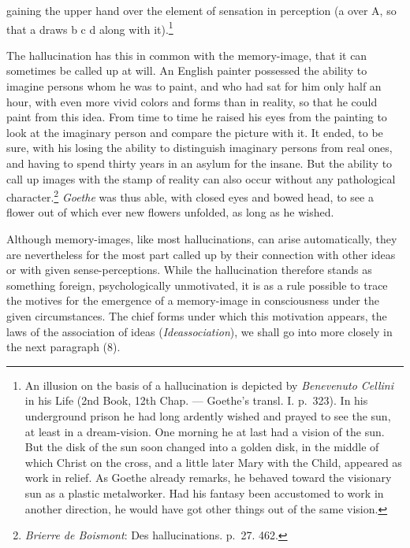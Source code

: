 \documentclass[12pt,a4paper]{book}
\newcommand{\opage}[1]{\marginnote{\footnotesize\textit{[#1]}}}
\begin{document}
gaining the upper hand over the element of sensation in perception (a
over A, so that a draws b c d along with it).\footnote{An illusion on the
basis of a hallucination is depicted by \emph{Benevenuto Cellini} in his
Life (2nd Book, 12th Chap. --- Goethe's transl. I. p.~323). In his
underground prison he had long ardently wished and prayed to see the sun,
at least in a dream-vision. One morning he at last had a vision of the
sun. But the disk of the sun soon changed into a golden disk, in the
middle of which Christ on the cross, and a little later Mary with the
Child, appeared as work in relief. As Goethe already remarks, he behaved
toward the visionary sun as a plastic metalworker. Had his fantasy been
accustomed to work in another direction, he would have got other things
out of the same vision.}

The hallucination has this in common with the memory-image, that it can
sometimes be called up at will. An English painter possessed the ability to
imagine persons whom he was to paint, and who had sat for him only half an
hour, with even more vivid colors and forms than in reality, so that he
could paint from this idea. From time to time he raised his eyes from the
painting to look at the imaginary person and compare the picture with it.
It ended, to be sure, with his losing the ability to distinguish imaginary
persons from real ones, and having to spend thirty years in an asylum for
the insane. But the ability to call up images with the stamp of reality
can also occur without any pathological
character.\footnote{\emph{Brierre de Boismont}: Des hallucinations.
p.~27. 462.} \emph{Goethe} was thus able, with closed
\opage{178}eyes and bowed head, to see a flower out of which ever new
flowers unfolded, as long as he wished.

Although memory-images, like most hallucinations, can arise automatically,
they are nevertheless for the most part called up by their connection with
other ideas or with given sense-perceptions. While the hallucination
therefore stands as something foreign, psychologically unmotivated, it is
as a rule possible to trace the motives for the emergence of a memory-image
in consciousness under the given circumstances. The chief forms under
which this motivation appears, the laws of the association of ideas
(\textit{Ideassociation}), we shall go into more closely in the next
paragraph (8).
\end{document}
